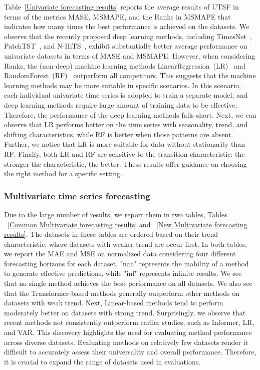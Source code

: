 \documentclass[sigconf, nonacm, pdfa]{acmart}
\begin{document}
Table~\ref{Univariate forecasting results} reports the average results of UTSF in terms of the metrics MASE, MSMAPE, and the Ranks in MSMAPE that indicates how many times the best performance is achieved on the datasets. 
We observe that the recently proposed deep learning methods, including TimesNet~\cite{wu2022timesnet}, PatchTST~\cite{nie2022time}, and N-HiTS~\cite{challu2023nhits}, exhibit substantially better average performance on univariate datasets in terms of MASE and MSMAPE. However, when considering Ranks, the (non-deep) machine learning methods LinearRegression~(LR)~\cite{kedem2005regression,herzen2022darts} and RandomForest~(RF)~\cite{breiman2001random} outperform all competitors. This suggests that the machine learning methods may be more suitable in specific scenarios. In this scenario, each individual univariate time series is adopted to train a separate model, and deep learning methods require large amount of training data to be effective. Therefore, 
the performance of the deep learning methods falls short. Next, we can observe that LR performs better on the time series with seasonality, trend, and shifting characteristics, while RF is better when those patterns are absent. Further, we notice that LR is more suitable for data without stationarity than RF. Finally, both LR and RF are sensitive to the transition characteristic: the stronger the characteristic, the better. These results offer guidance on choosing the right method for a specific setting. 
 

\subsubsection{Multivariate time series forecasting}
Due to the large number of results, we report them in two tables, Tables ~\ref{Common Multivariate forecasting results} and ~\ref{New Multivariate forecasting results}. The datasets in these tables are ordered based on their trend characteristic, where datasets with weaker trend are occur first. In both tables, we report the MAE and MSE on normalized data considering four different forecasting horizons for each dataset. "nan" represents the inability of a method to generate effective predictions, while "inf" represents infinite results. 
We see that no single method achieves the best performance on all datasets. We also see that the Transformer-based methods generally outperform other methods on datasets with weak trend. Next, Linear-based methods tend to perform moderately better on datasets with strong trend. Surprisingly, we observe that recent methods not consistently outperform earlier studies, such as Informer, LR, and VAR. This discovery highlights the need for evaluating method performance across diverse datasets.
Evaluating methods on relatively few datasets render it difficult to accurately assess their universality and overall performance. Therefore, it is crucial to expand the range of datasets used in evaluations.
\end{document}
